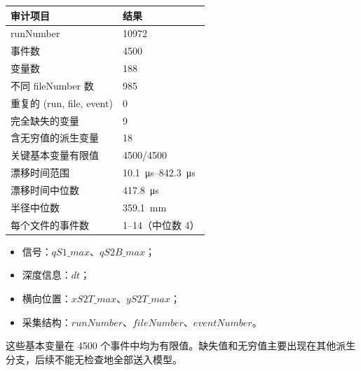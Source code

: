 \documentclass[UTF8,11pt,a4paper,oneside,fontset=none]{ctexart}
\begin{document}
\vspace{0.35em}
\begin{minipage}[t]{0.54\textwidth}
\centering
{}
\begin{tabularx}{0.97\linewidth}{@{}Y R{3.35cm}@{}}
\toprule
{}\textbf{审计项目} & \textbf{结果}\\
\midrule
runNumber & 10972\\
事件数 & \num{4500}\\
变量数 & 188\\
不同 fileNumber 数 & 985\\
重复的 (run, file, event) & 0\\
完全缺失的变量 & 9\\
含无穷值的派生变量 & 18\\
关键基本变量有限值 & \num{4500}/\num{4500}\\
漂移时间范围 & \SIrange{10.1}{842.3}{\micro\second}\\
漂移时间中位数 & \SI{417.8}{\micro\second}\\
半径中位数 & \SI{359.1}{\milli\metre}\\
每个文件的事件数 & 1--14（中位数 4）\\
\bottomrule
\end{tabularx}
\end{minipage}\hfill
\begin{minipage}[t]{0.42\textwidth}
\begin{keybox}[title={本部分实际使用的变量},fonttitle=\bfseries]
\begin{itemize}
  \item 信号：\(qS1\_max\)、\(qS2B\_max\)；
  \item 深度信息：\(dt\)；
  \item 横向位置：\(xS2T\_max\)、\(yS2T\_max\)；
  \item 采集结构：\(runNumber\)、\(fileNumber\)、\(eventNumber\)。
\end{itemize}
这些基本变量在 4500 个事件中均为有限值。缺失值和无穷值主要出现在其他派生分支，后续不能无检查地全部送入模型。
\end{keybox}

\vspace{0.45em}
\begin{center}
\end{center}
\end{minipage}
\end{document}
